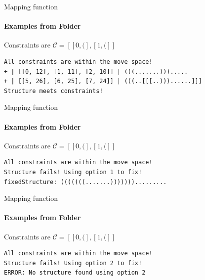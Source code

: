 \documentclass{beamer}
\begin{document}
\begin{frame}[fragile]{Mapping function}
\framesubtitle{Examples from Folder}
Constraints are $\mathcal{C} = [[0, (], [1, (]]$
\begin{tcolorbox}[colframe = asu_maroon, colback = white,title = Correct first try]
\begin{verbatim}
All constraints are within the move space!
+ | [[0, 12], [1, 11], [2, 10]] | (((.......))).....
+ | [[5, 26], [6, 25], [7, 24]] | (((..[[[..)))......]]]
Structure meets constraints!
\end{verbatim}
\end{tcolorbox}

\end{frame}

\begin{frame}[fragile]{Mapping function}
\framesubtitle{Examples from Folder}
Constraints are $\mathcal{C} = [[0, (], [1, (]]$
\begin{tcolorbox}[colframe = asu_maroon, colback = white,title = Option 1]
\begin{verbatim}
All constraints are within the move space!
Structure fails! Using option 1 to fix!
fixedStructure: (((((((.......))))))).........
\end{verbatim}
\end{tcolorbox}

\end{frame}

\begin{frame}[fragile]{Mapping function}
\framesubtitle{Examples from Folder}
Constraints are $\mathcal{C} = [[0, (], [1, (]]$
\begin{tcolorbox}[colframe = asu_maroon, colback = white,title = Option 2]
\begin{verbatim}
All constraints are within the move space!
Structure fails! Using option 2 to fix!
ERROR: No structure found using option 2
\end{verbatim}
\end{tcolorbox}

\end{frame}
\end{document}
